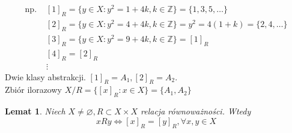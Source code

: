 \documentclass[a5paper,8pt]{article}
\theoremstyle{mythmstyle}
\newtheorem{lemat}{Lemat}[section]
\begin{document}
            \begin{equation*}
              \begin{aligned}
                \text{np. }& [1]_R = \{ y \in X : y^2 = 1 + 4k, k \in \mathbb{Z} \} = \{ 1, 3, 5, \ldots \} \\
                &[2]_R = \{ y \in X : y^2 = 4 + 4k, k \in \mathbb{Z} \} = y^2 = 4(1 + k) = \{2, 4, \ldots \} \\
                &[3]_R = \{ y \in X : y^2 = 9 + 4k, k \in \mathbb{Z} \} = [1]_R \\
                &[4]_R = [2]_R \\
                &\vdots
              \end{aligned}
            \end{equation*}
            Dwie klasy abstrakcji. $ [1]_R = A_1, [2]_R = A_2 $. \\
            Zbiór ilorazowy $ X / R = \{ [x]_R : x \in X \} = \{ A_1, A_2 \} $
            \pagebreak

            \begin{lemat}
                Niech $ X \neq \varnothing, R \subset X \times X $ relacja równoważności. Wtedy
                \begin{equation*}
                    x R y \iff [x]_R = [y]_R, \forall x, y \in X
                \end{equation*}
            \end{lemat}
\end{document}
